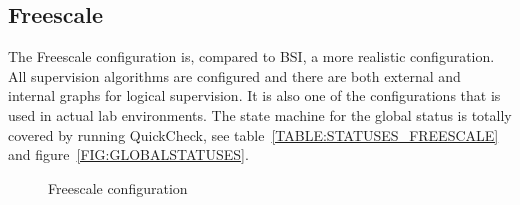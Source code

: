 \subsection{Freescale}
The Freescale configuration is, compared to BSI, a more realistic configuration.
All supervision algorithms are configured and there are both external and
internal graphs for logical supervision. It is also one of the configurations
that is used in actual lab environments. The state machine for the global
status is totally covered by running QuickCheck, see
table~\ref{TABLE:STATUSES_FREESCALE} and figure~\ref{FIG:GLOBALSTATUSES}.

\begin{figure}[!ht]
  \begin{center}
  \end{center}
  \caption{Freescale configuration}
  \label{FIG:FREESCALE}
\end{figure}

